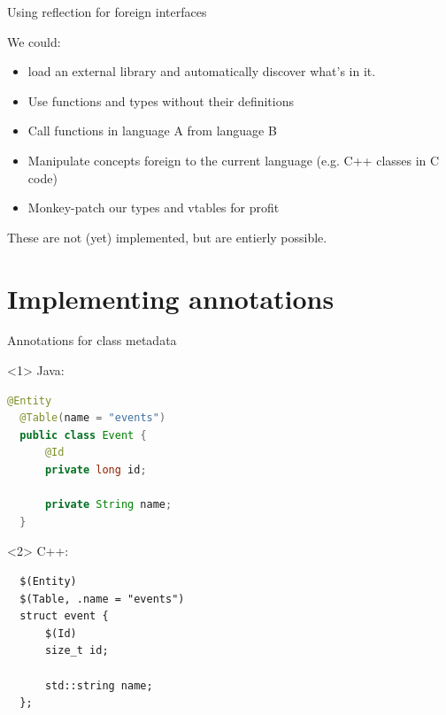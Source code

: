 \documentclass[10pt]{beamer}
\begin{document}
\begin{frame}[fragile]{Using reflection for foreign interfaces}

  We could:

  \begin{itemize}[<+-|alert@+>]
    \item load an external library and automatically discover what's in it.
    \item Use functions and types without their definitions
    \item Call functions in language A from language B
    \item Manipulate concepts foreign to the current language (e.g. C++ classes
          in C code)
    \item Monkey-patch our types and vtables for profit
  \end{itemize}

  \pause{}

  These are not (yet) implemented, but are entierly possible.

\end{frame}

\section{Implementing annotations}

\begin{frame}[fragile]{Annotations for class metadata}

  \begin{onlyenv}<1>
  Java:
  \begin{lstlisting}[language=Java]
  @Entity
  @Table(name = "events")
  public class Event {
      @Id
      private long id;

      private String name;
  }
  \end{lstlisting}
  \end{onlyenv}

  \begin{onlyenv}<2>
  C++:
  \begin{lstlisting}
  $(Entity)
  $(Table, .name = "events")
  struct event {
      $(Id)
      size_t id;

      std::string name;
  };
  \end{lstlisting}
  \end{onlyenv}

\end{frame}

\end{document}
